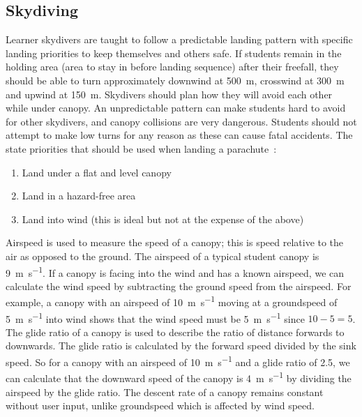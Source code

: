 \documentclass[11pt, a4paper, twocolumn]{article}
\begin{document}
\subsection{Skydiving}
Learner skydivers are taught to follow a predictable landing pattern with specific landing priorities to keep themselves and others safe. If students remain in the holding area (area to stay in before landing sequence) after their freefall, they should be able to turn approximately downwind at \SI{500}{\metre}, crosswind at \SI{300}{\metre} and upwind at \SI{150}{\metre}. Skydivers should plan how they will avoid each other while under canopy. An unpredictable pattern can make students hard to avoid for other skydivers, and canopy collisions are very dangerous. Students should not attempt to make low turns for any reason as these can cause fatal accidents. The \citeauthor{british_parachute_association_chmanual.pdf_nodate} state priorities that should be used when landing a parachute~\cite{british_parachute_association_chmanual.pdf_nodate}:

\begin{enumerate}
    \item Land under a flat and level canopy
    \item Land in a hazard-free area
    \item Land into wind (this is ideal but not at the expense of the above)
\end{enumerate}


Airspeed is used to measure the speed of a canopy; this is speed relative to the air as opposed to the ground. The airspeed of a typical student canopy is \SI{9}{\metre\per\second}. If a canopy is facing into the wind and has a known airspeed, we can calculate the wind speed by subtracting the ground speed from the airspeed. For example, a canopy with an airspeed of \SI{10}{\metre\per\second} moving at a groundspeed of \SI{5}{\metre\per\second} into wind shows that the wind speed must be \SI{5}{\metre\per\second} since $10 - 5 = 5$.
The glide ratio of a canopy is used to describe the ratio of distance forwards to downwards. The glide ratio is calculated by the forward speed divided by the sink speed. So for a canopy with an airspeed of \SI{10}{\metre\per\second} and a glide ratio of 2.5, we can calculate that the downward speed of the canopy is \SI{4}{\metre\per\second} by dividing the airspeed by the glide ratio. The descent rate of a canopy remains constant without user input, unlike groundspeed which is affected by wind speed.
\end{document}
